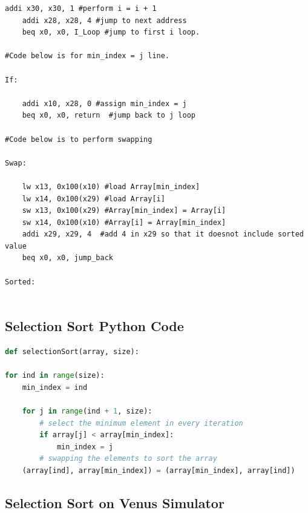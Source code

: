 \documentclass{article}
\begin{document}
\begin{lstlisting}[caption={Selection Sort Assembly code}, captionpos=b, language=RISC-V]
    addi x30, x30, 1 #perform i = i + 1
    addi x28, x28, 4 #jump to next address
    beq x0, x0, I_Loop #jump to first i loop.
    
#Code below is for min_index = j line.

If:

    addi x10, x28, 0 #assign min_index = j
    beq x0, x0, return  #jump back to j loop

#Code below is to perform swapping

Swap:

    lw x13, 0x100(x10) #load Array[min_index]
    lw x14, 0x100(x29) #load Array[i] 
    sw x13, 0x100(x29) #Array[min_index] = Array[i]
    sw x14, 0x100(x10) #Array[i] = Array[min_index]
    addi x29, x29, 4  #add 4 in x29 so that it doesnot include sorted value
    beq x0, x0, jump_back

Sorted:
    

\end{lstlisting}

\subsection{Selection Sort Python Code}

\begin{lstlisting}[caption={Selection Sort Python Code (Taken from GeeksforGeeks)}, captionpos=b, language=Python]
def selectionSort(array, size):

for ind in range(size):
    min_index = ind

    for j in range(ind + 1, size):
        # select the minimum element in every iteration
        if array[j] < array[min_index]:
            min_index = j
        # swapping the elements to sort the array
    (array[ind], array[min_index]) = (array[min_index], array[ind])    
\end{lstlisting}

\newpage

\subsection{Selection Sort on Venus Simulator}
\end{document}
